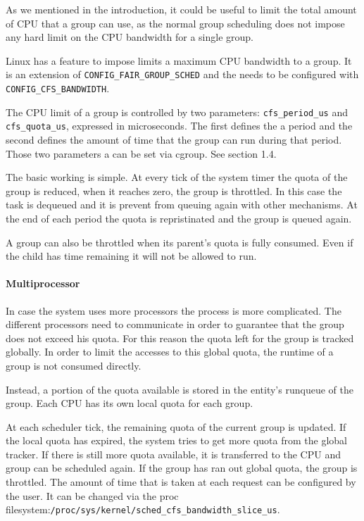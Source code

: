 As we mentioned in the introduction, it could be useful to limit the total amount of CPU that a group can use, as the normal group scheduling does not impose any hard limit on the CPU bandwidth for a single group. 

Linux has a feature to impose limits a maximum CPU bandwidth to a group. It is an extension of \verb|CONFIG_FAIR_GROUP_SCHED| and the needs to be configured with \verb|CONFIG_CFS_BANDWIDTH|.

The CPU limit of a group is controlled by two parameters:  \verb|cfs_period_us| and \verb|cfs_quota_us|, expressed in microseconds. The first defines the a period and the second defines the amount of time that the group can run during that period. Those two parameters a can be set via cgroup. See section 1.4.

The basic working is simple. At every tick of the system timer the quota of the group is reduced, when it reaches zero, the group is throttled. In this case the task is dequeued and it is prevent from queuing again with other mechanisms. At the end of each period the quota is repristinated and the group is queued again.

A group can also be throttled when its parent's quota is fully consumed. Even if the child has time remaining it will not be allowed to run.

\paragraph{Multiprocessor}
In case the system uses more processors the process is more complicated. The different processors need to communicate in order to guarantee that the group does not exceed his quota. For this reason the quota left for the group is tracked globally. In order to limit the accesses to this global quota, the runtime of a group is not consumed directly.

Instead, a portion of the quota available is stored in the entity's runqueue of the group. Each CPU has its own local quota for each group.

At each scheduler tick, the remaining quota of the current group is updated. If the local quota has expired, the system tries to get more quota from the global tracker. If there is still more quota available, it is transferred to the CPU and group can be scheduled again. If the group has ran out global quota, the group is throttled. The amount of time that is taken at each request can be configured by the user. It can be changed via the proc filesystem:\verb|/proc/sys/kernel/sched_cfs_bandwidth_slice_us|.

